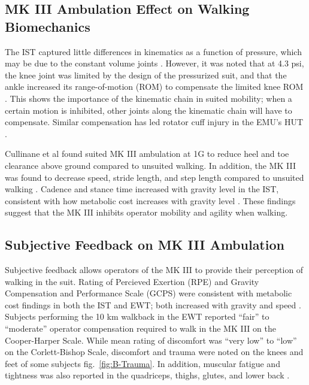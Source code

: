 \documentclass[defaultstyle,11pt]{comps}
\begin{document}
\hypertarget{mk-iii-ambulation-effect-on-walking-biomechanics}{%
\subsection{MK III Ambulation Effect on Walking Biomechanics}\label{mk-iii-ambulation-effect-on-walking-biomechanics}}

The IST captured little differences in kinematics as a function of pressure, which may be due to the constant volume joints \citep{Norcross2010}.
However, it was noted that at 4.3 psi, the knee joint was limited by the design of the pressurized suit, and that the ankle increased its range-of-motion (ROM) to compensate the limited knee ROM \citep{Norcross2010}.
This shows the importance of the kinematic chain in suited mobility; when a certain motion is inhibited, other joints along the kinematic chain will have to compensate.
Similar compensation has led rotator cuff injury in the EMU's HUT \citep{Williams2003}.

Cullinane et al \citep{Cullinane2017a} found suited MK III ambulation at 1G to reduce heel and toe clearance above ground compared to unsuited walking.
In addition, the MK III was found to decrease speed, stride length, and step length compared to unsuited walking \citep{Cullinane2017a}.
Cadence and stance time increased with gravity level in the IST, consistent with how metabolic cost increases with gravity level \citep{Norcross2010}.
These findings suggest that the MK III inhibits operator mobility and agility when walking.

\hypertarget{subjective-feedback-on-mk-iii-ambulation}{%
\subsection{Subjective Feedback on MK III Ambulation}\label{subjective-feedback-on-mk-iii-ambulation}}

Subjective feedback allows operators of the MK III to provide their perception of walking in the suit.
Rating of Percieved Exertion (RPE) and Gravity Compensation and Performance Scale (GCPS) were consistent with metabolic cost findings in both the IST and EWT; both increased with gravity and speed \citep{Norcross2009, Norcross2010}.
Subjects performing the 10 km walkback in the EWT reported ``fair'' to ``moderate'' operator compensation required to walk in the MK III on the Cooper-Harper Scale\citep{Norcross2009}.
While mean rating of discomfort was ``very low'' to ``low'' on the Corlett-Bishop Scale, discomfort and trauma were noted on the knees and feet of some subjects \citep{Norcross2009} fig.~\ref{fig:B-Trauma}.
In addition, muscular fatigue and tightness was also reported in the quadriceps, thighs, glutes, and lower back \citep{Norcross2009}.
\end{document}
